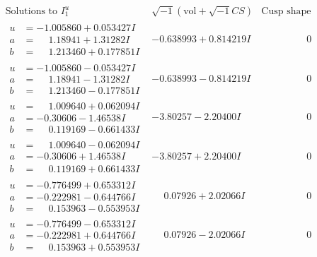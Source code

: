 \documentclass[1p]{elsarticle_modified}
\theoremstyle{definition}
\newcommand{\I}{\sqrt{-1}}
\begin{document}
$$\begin{array}{c|c|c}  
\text{Solutions to }I^u_{1}& \I (\text{vol} + \sqrt{-1}CS) & \text{Cusp shape}\\
 \hline 
\begin{aligned}
u &= -1.005860 + 0.053427 I \\
a &= \phantom{-}1.18941 + 1.31282 I \\
b &= \phantom{-}1.213460 + 0.177851 I\end{aligned}
 & -0.638993 + 0.814219 I & \phantom{-0.000000 } 0 \\ \hline\begin{aligned}
u &= -1.005860 - 0.053427 I \\
a &= \phantom{-}1.18941 - 1.31282 I \\
b &= \phantom{-}1.213460 - 0.177851 I\end{aligned}
 & -0.638993 - 0.814219 I & \phantom{-0.000000 } 0 \\ \hline\begin{aligned}
u &= \phantom{-}1.009640 + 0.062094 I \\
a &= -0.30606 - 1.46538 I \\
b &= \phantom{-}0.119169 - 0.661433 I\end{aligned}
 & -3.80257 - 2.20400 I & \phantom{-0.000000 } 0 \\ \hline\begin{aligned}
u &= \phantom{-}1.009640 - 0.062094 I \\
a &= -0.30606 + 1.46538 I \\
b &= \phantom{-}0.119169 + 0.661433 I\end{aligned}
 & -3.80257 + 2.20400 I & \phantom{-0.000000 } 0 \\ \hline\begin{aligned}
u &= -0.776499 + 0.653312 I \\
a &= -0.222981 - 0.644766 I \\
b &= \phantom{-}0.153963 - 0.553953 I\end{aligned}
 & \phantom{-}0.07926 + 2.02066 I & \phantom{-0.000000 } 0 \\ \hline\begin{aligned}
u &= -0.776499 - 0.653312 I \\
a &= -0.222981 + 0.644766 I \\
b &= \phantom{-}0.153963 + 0.553953 I\end{aligned}
 & \phantom{-}0.07926 - 2.02066 I & \phantom{-0.000000 } 0 \\ \hline\begin{aligned}

\end{aligned}
\end{array}$$
\end{document}
